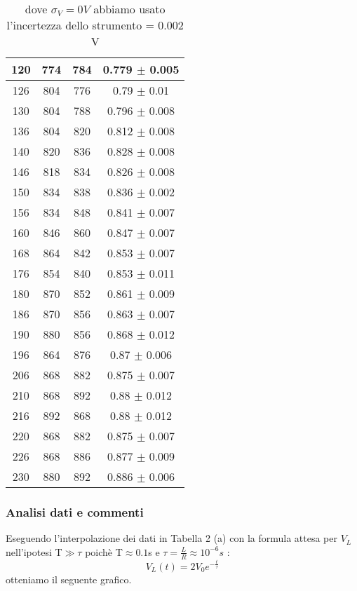 \documentclass[a4paper]{article}
\theoremstyle{definition}
\begin{document}
\begin{table}[!htbp]
{\begin{minipage}{.7\linewidth}
\begin{tabular}{c|cc|c}
        \hline
        120& 774& 784 &  0.779  \(\pm\) 0.005\\
        \hline
        126& 804& 776  &  0.79 \(\pm\)  0.01\\
        \hline
        130& 804& 788  & 0.796 \(\pm\)  0.008\\
        \hline
        136& 804& 820  & 0.812 \(\pm\)  0.008\\
        \hline
        140& 820& 836  &0.828 \(\pm\)  0.008\\
        \hline
        146& 818& 834 & 0.826 \(\pm\)  0.008\\
        \hline
        150& 834& 838  & 0.836  \(\pm\) 0.002\\
        \hline
        156& 834& 848  &  0.841  \(\pm\) 0.007\\
        \hline
        160&  846& 860  &  0.847 \(\pm\)  0.007\\
        \hline
        168& 864&842 & 0.853  \(\pm\) 0.007\\
        \hline
        176& 854& 840  & 0.853  \(\pm\) 0.011\\
        \hline
        180& 870& 852 & 0.861 \(\pm\)  0.009\\
        \hline
        186& 870& 856  & 0.863  \(\pm\) 0.007\\
        \hline
        190& 880& 856  & 0.868  \(\pm\) 0.012\\
        \hline
        196&  864& 876 & 0.87 \(\pm\)  0.006\\
        \hline
        206& 868&882 &  0.875 \(\pm\)  0.007\\
        \hline
        210& 868& 892  & 0.88 \(\pm\)  0.012\\
        \hline
        216& 892& 868 & 0.88 \(\pm\)  0.012\\
        \hline
        220& 868& 882 & 0.875 \(\pm\)  0.007\\
        \hline
        226& 868& 886 & 0.877 \(\pm\) 0.009\\
        \hline
        230& 880& 892 & 0.886 \(\pm\)  0.006\\
        \hline
        \hline
    \end{tabular}
    \end{minipage} 
    }
    \caption{dove \(\sigma_{V} = 0 V\) abbiamo usato l'incertezza dello strumento = 0.002 V}

\end{table}


\pagebreak

\subsubsection*{Analisi dati e commenti}
\label{subsec:res_parassite}
Eseguendo l'interpolazione dei dati in Tabella 2 (a) con la formula attesa per \(V_{L}\) nell'ipotesi T\(\gg \tau\) poichè T\(\approx 0.1\)s e \(\tau = \frac{L}{R} \approx 10^{-6}s\) :
\[V_{L}(t) = 2V_{0}e^{-\frac{t}{\tau}}\]
otteniamo il seguente grafico. \\
\end{document}
